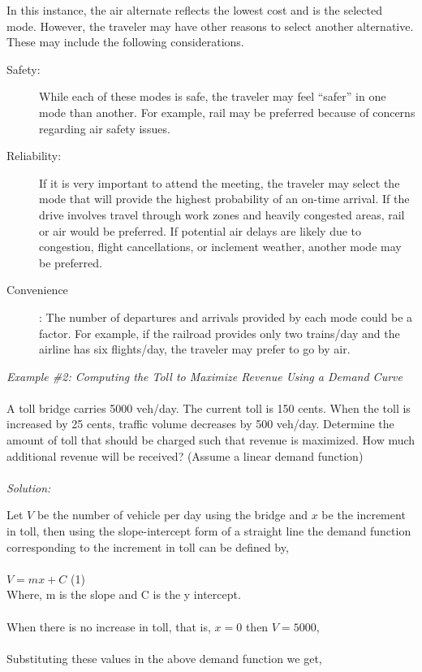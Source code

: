 In this instance, the air alternate reflects the lowest cost and is the selected mode. However, the traveler may have other reasons to select another alternative. These may include the following considerations.
\begin{description}
	\item [Safety:]While each of these modes is safe, the traveler may feel “safer” in one mode than another. For example, rail may be preferred because of concerns regarding air safety issues.
	\item [Reliability:] If it is very important to attend the meeting, the traveler may select the mode that will provide the highest probability of an on-time arrival. If the drive involves travel through work zones and heavily congested areas, rail or air would be preferred. If potential air delays are likely due to congestion, flight cancellations, or inclement weather, another mode may be preferred.
	\item [Convenience]: The number of departures and arrivals provided by each mode could be a factor. For example, if the railroad provides only two trains/day and the airline has six flights/day, the traveler may prefer to go by air.
\end{description}
%
\emph{Example \#2: Computing the Toll to Maximize Revenue Using a Demand Curve}\\\\
A toll bridge carries 5000 veh/day. The current toll is 150 cents. When the toll is increased by 25 cents, traffic volume decreases by 500 veh/day. Determine the amount of toll that should be charged such that revenue is maximized. How much additional revenue will be received? (Assume a linear demand function)\\\\
\emph{Solution:}
\par
Let $ V $ be the number of vehicle per day using the bridge and $ x $ be the increment in toll, then using the slope-intercept form of a straight line the demand function corresponding to the increment in toll can be defined by,\\\\
$V = mx + C$ (1)\\
Where, m is the slope and C is the y intercept.\\\\
When there is no increase in toll, that is, $ x = 0 $ then $ V = 5000 $,\\\\
Substituting these values in the above demand function we get,\\
